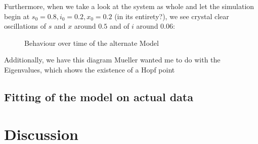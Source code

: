 \documentclass[12pt,a4paper,twoside]{article}
\begin{document}
Furthermore, when we take a look at the system as whole and let the simulation begin at $s_0 = 0.8, i_0 = 0.2, x_0 = 0.2$ (in its entirety?), we see crystal clear oscillations of $s$ and $x$ around $0.5$ and of $i$ around $0.06$:

\begin{figure}[h!]
	\centering
	\def\svgwidth{350pt}
	
	\caption{Behaviour over time of the alternate Model}
	\label{fig:s_vs_i_vs_x}
\end{figure}

Additionally, we have this diagram Mueller wanted me to do with the Eigenvalues, which shows the existence of a Hopf point %


\subsection{Fitting of the model on actual data}

\section{Discussion}


\newpage
\printbibliography
\end{document}
